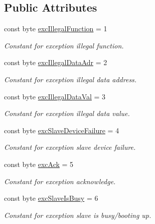 \subsection*{Public Attributes}
\begin{DoxyCompactItemize}
\item 
const byte \hyperlink{class_robo_library_1_1_mod_bus_a7d880ad2a5e4f294d9ce80ab4b201894}{exc\+Illegal\+Function} = 1
\begin{DoxyCompactList}\small\item\em Constant for exception illegal function.\end{DoxyCompactList}\item 
const byte \hyperlink{class_robo_library_1_1_mod_bus_a2b8c0ab4af8f79c7c914116cf96a3753}{exc\+Illegal\+Data\+Adr} = 2
\begin{DoxyCompactList}\small\item\em Constant for exception illegal data address.\end{DoxyCompactList}\item 
const byte \hyperlink{class_robo_library_1_1_mod_bus_a08b557ce75222b5972a6a5b92b6efa99}{exc\+Illegal\+Data\+Val} = 3
\begin{DoxyCompactList}\small\item\em Constant for exception illegal data value.\end{DoxyCompactList}\item 
const byte \hyperlink{class_robo_library_1_1_mod_bus_a23f40b9de42b38035088cf579e960c59}{exc\+Slave\+Device\+Failure} = 4
\begin{DoxyCompactList}\small\item\em Constant for exception slave device failure.\end{DoxyCompactList}\item 
const byte \hyperlink{class_robo_library_1_1_mod_bus_aa8bf5e0ad00a3996ab17afcc1b515ab6}{exc\+Ack} = 5
\begin{DoxyCompactList}\small\item\em Constant for exception acknowledge.\end{DoxyCompactList}\item 
const byte \hyperlink{class_robo_library_1_1_mod_bus_a3057571657af1e777174499c9203aee8}{exc\+Slave\+Is\+Busy} = 6
\begin{DoxyCompactList}\small\item\em Constant for exception slave is busy/booting up.\end{DoxyCompactList}\item 

\end{DoxyCompactItemize}
